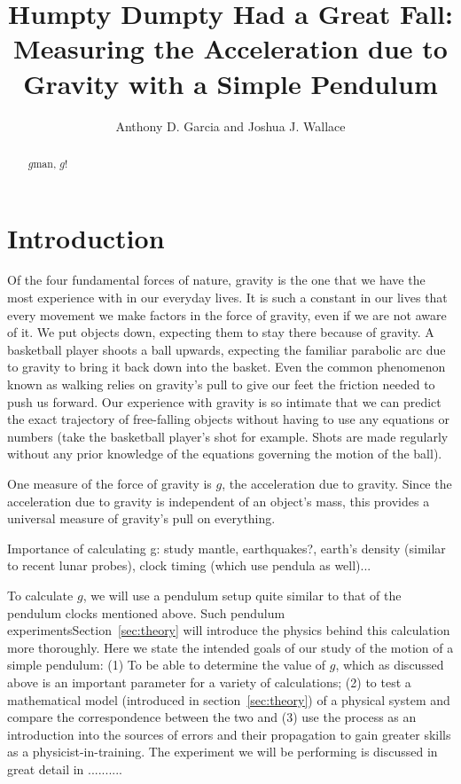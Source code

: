 \documentclass[iop,numberedappendix,appendixfloats]{emulateapj}
\def\g{$g$}
\begin{document}
\title{Humpty Dumpty Had a Great Fall: Measuring the Acceleration due to Gravity with a Simple Pendulum}

\author{ Anthony D. Garcia
and
Joshua J. Wallace}

\begin{abstract}

\g man, \g!

\end{abstract}

\section{Introduction}

Of the four fundamental forces of nature, gravity is the one that we have the 
most experience with in our everyday lives.  It is such a constant in our lives 
that every movement we make factors in the force of gravity, even if we are not
aware of it. We put objects down, expecting them to stay there because of 
gravity. A basketball player shoots a ball upwards, expecting the familiar 
parabolic arc due to gravity to bring it back down into the basket.  Even the
common phenomenon known as walking relies on gravity's pull to give our feet
the friction needed to push us forward. Our experience with gravity is so
intimate that we can predict the exact trajectory of free-falling objects 
without having to use any equations or numbers (take the basketball player's 
shot for example. Shots are made regularly without any prior knowledge of 
the equations governing the motion of the ball).

One measure of the force of gravity is \g, the acceleration due to gravity. 
Since the acceleration due to gravity is independent of an object's mass, 
this provides a universal measure of gravity's pull on everything.

Importance of calculating g:  study mantle, earthquakes?, earth's density 
(similar to recent lunar probes), clock timing (which use pendula as well)...

To calculate \g, we will use a pendulum setup quite similar to that of the
pendulum clocks mentioned above.  Such pendulum experimentsSection~\ref{sec:theory} will introduce the 
physics behind this calculation more thoroughly.  Here we state the intended 
goals of our study of the motion of a simple pendulum:  (1) To be able to 
determine the value of \g, which as discussed above is an important parameter
for a variety of calculations; (2) to test a mathematical model (introduced in 
section~\ref{sec:theory}) of a physical system and compare the correspondence 
between the two and (3) use the process as an introduction into the sources of 
errors and their propagation to gain greater skills as a physicist-in-training. 
The experiment we will be performing is discussed in great detail in .......... 
\end{document}

